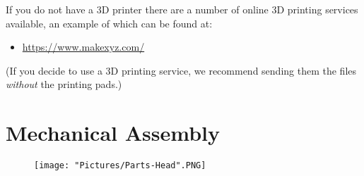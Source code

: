 \documentclass[12pt]{article}
\begin{document}
If you do not have a 3D printer there are a number of online 3D printing services available, an example of which can be found at:

\begin{itemize}
	\item \href{https://www.makexyz.com/}{https://www.makexyz.com/}
\end{itemize}

(If you decide to use a 3D printing service, we recommend sending them the files \textit{without} the printing pads.)
\section{Mechanical Assembly}

\begin{figure}[H]
	\centering
	\texttt{[image: "Pictures/Parts-Head".PNG]}
\end{figure}
\end{document}

